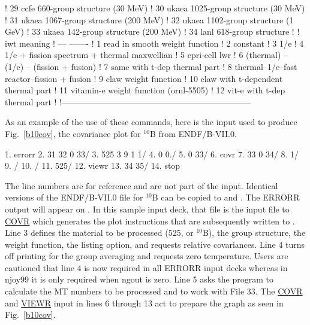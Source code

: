 \begin{ccode}
   !      29           ccfe   660-group structure  (30 MeV)
   !      30           ukaea 1025-group structure  (30 MeV)
   !      31           ukaea 1067-group structure (200 MeV)
   !      32           ukaea 1102-group structure   (1 GeV)
   !      33           ukaea  142-group structure (200 MeV)
   !      34           lanl 618-group structure
   !
   !      iwt          meaning
   !      ---          -------
   !       1           read in smooth weight function
   !       2           constant
   !       3           1/e
   !       4           1/e + fission spectrum + thermal maxwellian
   !       5           epri-cell lwr
   !       6           (thermal) -- (1/e) -- (fission + fusion)
   !       7           same with t-dep thermal part
   !       8           thermal--1/e--fast reactor--fission + fusion
   !       9           claw weight function
   !      10           claw with t-dependent thermal part
   !      11           vitamin-e weight function (ornl-5505)
   !      12           vit-e with t-dep thermal part
   !
   !--------------------------------------------------------------------

\end{ccode}
\normalsize

As an example of the use of these commands, here is the input used
to produce Fig.~\ref{b10cov}, the covariance plot for $^{10}$B
from ENDF/B-VII.0.

\small
\begin{ccode}

    1. errorr
    2. 31 32 0 33/
    3. 525 3 9 1 1/
    4. 0 0./
    5. 0 33/
    6. covr
    7. 33 0 34/
    8. 1/
    9. /
   10. /
   11. 525/
   12. viewr
   13. 34 35/
   14. stop

\end{ccode}
\normalsize

\noindent
The line numbers are for reference and are not part of the input.
Identical versions of the ENDF/B-VII.0 file for $^{10}$B can be
copied to  and .  The ERRORR output
will appear on .  In this sample input deck, that file
is the input file to \hyperlink{sCOVRhy}{COVR} which
generates the plot instructions that are subsequently written to
.  Line 3 defines the material to be
processed (525, or $^{10}$B), the group structure, the weight function,
the listing option, and requests relative covariances.  Line 4 turns
off printing for the group averaging and requests zero temperature.
Users are cautioned that line 4 is now required in all ERRORR input decks
whereas in njoy99 it is only required when ngout is zero.  Line 5
asks the program to calculate the MT numbers to be processed
and to work with File 33.  The \hyperlink{sCOVRhy}{COVR} and
\hyperlink{sVIEWRhy}{VIEWR} input in lines 6 through
13 act to prepare the graph as seen in Fig.~\ref{b10cov}.

